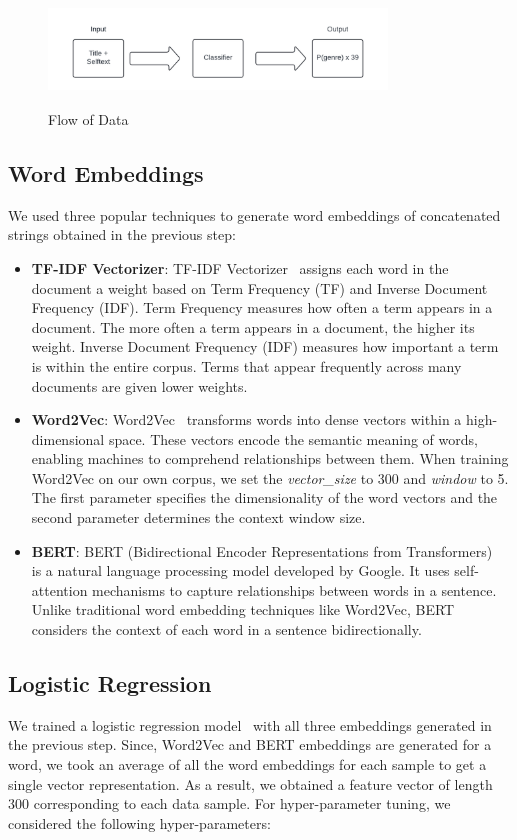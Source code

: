 \documentclass[conference]{IEEEtran}
\begin{document}
\begin{figure}[!htb]
\centering
\includegraphics[width=90mm, height = 30mm]{Images/DataPreprocessing.png}
\caption{Flow of Data}\label{fig:dataPreprocessing}
\end{figure}

\subsection{Word Embeddings}
We used three popular techniques to generate word embeddings of concatenated strings obtained in the previous step:

\begin{itemize}
    \item \textbf{TF-IDF Vectorizer}: TF-IDF Vectorizer~\cite{tfidf} assigns each word in the document a weight based on Term Frequency (TF) and Inverse Document Frequency (IDF). Term Frequency measures how often a term appears in a document. The more often a term appears in a document, the higher its weight. Inverse Document Frequency (IDF) measures how important a term is within the entire corpus. Terms that appear frequently across many documents are given lower weights.
    \item \textbf{Word2Vec}: Word2Vec~\cite{word2vec} transforms words into dense vectors within a high-dimensional space. These vectors encode the semantic meaning of words, enabling machines to comprehend relationships between them. When training Word2Vec on our own corpus, we set the \textit{vector\_size} to 300 and \textit{window} to 5. The first parameter specifies the dimensionality of the word vectors and the second parameter determines the context window size. 
    \item \textbf{BERT}: BERT (Bidirectional Encoder Representations from Transformers)~\cite{devlin2019bert} is a natural language processing model developed by Google. It uses self-attention mechanisms to capture relationships between words in a sentence. Unlike traditional word embedding techniques like Word2Vec, BERT considers the context of each word in a sentence bidirectionally.
\end{itemize}

\subsection{Logistic Regression}
We trained a logistic regression model~\cite{Komarek-2004-8925} with all three embeddings generated in the previous step. Since, Word2Vec and BERT embeddings are generated for a word, we took an average of all the word embeddings for each sample to get a single vector representation. As a result, we obtained a feature vector of length 300 corresponding to each data sample. For hyper-parameter tuning, we considered the following hyper-parameters:
\end{document}
